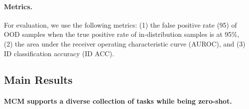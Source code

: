 \documentclass{article}
\begin{document}
\paragraph{Metrics.} For evaluation,
we use the following metrics: (1) the false positive rate (95) of OOD samples when the true positive rate of in-distribution samples is at 95\%, (2) the area under the receiver operating characteristic curve (AUROC), and (3) ID classification accuracy (ID ACC). 

\subsection{Main Results}

\paragraph{MCM supports a diverse collection of tasks while being zero-shot.} 
\end{document}
